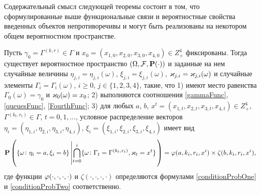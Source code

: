 \documentclass[a4paper,12pt,russian]{extarticle}
\newcommand{\G}{\Gamma}
\newcommand{\ga}[1]{\Gamma^{\left( #1 \right)} }
\renewcommand{\Pr}{{\mathbf P}}
\begin{document}
Содержательный смысл следующей теоремы состоит в том, что сформулированные выше функциональные связи и вероятностные свойства введенных объектов непротиворечивы и могут быть реализованы на некотором общем вероятностном пространстве.
\begin{theorem}
Пусть $\gamma_0=\ga{k,r} \in \G$ и $x_0=(x_{1,0},x_{2,0}, x_{3,0},x_{4,0})\in Z_+^4$ фиксированы.
Тогда существует вероятностное пространство $(\Omega, {\cal F}, \Pr(\cdot))$ и заданные на нем случайные величины $\eta_{j,i}=\eta_{j,i}(\omega)$, $\xi_{j,i}=\xi_{j,i}(\omega)$, 	 $\varkappa_{j,i}=\varkappa_{j,i}(\omega)$ и случайные элементы $\G_i=\G_i(\omega)$, $i\geqslant 0$, $j\in \{1, 2, 3, 4\}$, такие, что 1) имеют место равенства $\G_0(\omega) = \gamma_0$ и $\varkappa_0(\omega)=x_0$; 2) выполняются соотношения \eqref{gammaFunc}, \eqref{queuesFunc}, \eqref{FourthFunc}; 3) для любых  $a$, $b$, $x^t=(x_{1,t},x_{2,t},x_{3,t},x_{4,t}) \in Z_+^4$, $\ga{k_t,r_t} \in \G$, $t = 0, 1, \ldots$, условное распределение векторов $\eta_i=(\eta_{1,i}, \eta_{2,i}, \eta_{3,i}, \eta_{4,i})$, $\xi_i=(\xi_{1,i}, \xi_{2,i}, \xi_{3,i}, \xi_{4,i})$ имеет вид
\begin{equation}
\Pr \left(\{ \omega \colon \eta_i = a, \xi_i=b\} \left|\bigcap_{t=0}^{i}\{\omega\colon \G_t=\ga{k_t,r_t}, \vk_t=x^t\}\right.\right)=
\vp(a,k_i,r_i,x^i)\times \zeta(b,k_i,r_i,x^i),
\label{ProbablititiesToProve}
\end{equation}
где функции $\varphi(\cdot, \cdot, \cdot, \cdot)$ и $\zeta(\cdot, \cdot, \cdot, \cdot)$ определяются формулами \eqref{conditionProbOne} и \eqref{conditionProbTwo} соответственно.

\label{myTheorem}
\end{theorem}
\end{document}
